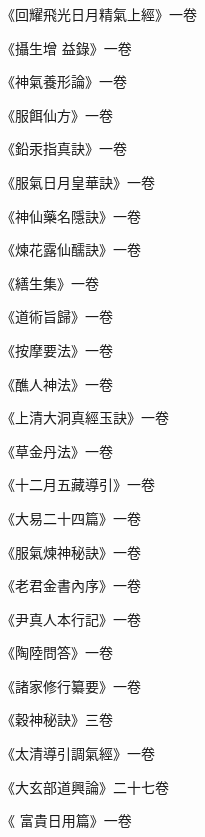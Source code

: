 \begin{pinyinscope}
 《回耀飛光日月精氣上經》一卷



 《攝生增
 益錄》一卷



 《神氣養形論》一卷



 《服餌仙方》一卷



 《鉛汞指真訣》一卷



 《服氣日月皇華訣》一卷



 《神仙藥名隱訣》一卷



 《煉花露仙醹訣》一卷



 《繕生集》一卷



 《道術旨歸》一卷



 《按摩要法》一卷



 《醮人神法》一卷



 《上清大洞真經玉訣》一卷



 《草金丹法》一卷



 《十二月五藏導引》一卷



 《大易二十四篇》一卷



 《服氣煉神秘訣》一卷



 《老君金書內序》一卷



 《尹真人本行記》一卷



 《陶陸問答》一卷



 《諸家修行纂要》一卷



 《穀神秘訣》三卷



 《太清導引調氣經》一卷



 《大玄部道興論》二十七卷



 《
 富貴日用篇》一卷




\end{pinyinscope}
